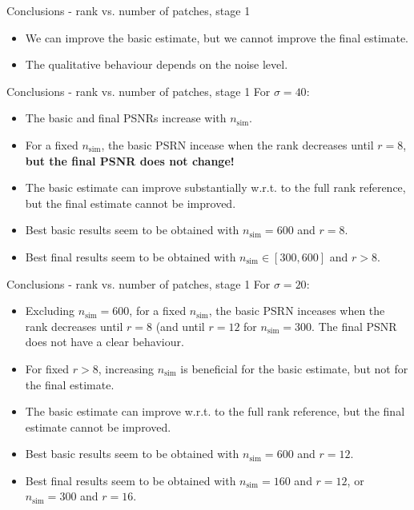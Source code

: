\documentclass[mathserif, 8pt]{beamer}
\makeatletter
\newcounter{multipleslide}
\newcommand{\multipleframe}{%
\setcounter{multipleslide}{\value{framenumber}}
\stepcounter{multipleslide}
\patchcmd{\beamer@@tmpl@footline}%
	{\insertframenumber}%
	{\themultipleslide}%
	{}%
	{}%
}
\makeatother
\begin{document}
\multipleframe
\begin{frame}{Conclusions - rank vs. number of patches, stage 1}
	\begin{itemize}\itemsep=2cm
		\item We can improve the basic estimate, but we cannot improve the final estimate.
		\item The qualitative behaviour depends on the noise level.
	\end{itemize}
\end{frame}

\begin{frame}{Conclusions - rank vs. number of patches, stage 1}
	For $\sigma = 40$:
	\begin{itemize}\itemsep=.3cm
		\item The basic and final PSNRs increase with $n_{\text{sim}}$.
		\item For a fixed $n_{\text{sim}}$, the basic PSRN incease when the
			rank decreases until $r = 8$, \textbf{but the final PSNR does not change!}
		\item The basic estimate can improve substantially w.r.t. to the
			full rank reference, but the final estimate cannot be improved.
		\item Best basic results seem to be obtained with $n_{\text{sim}} = 
			600$ and $r = 8$.
		\item Best final results seem to be obtained with $n_{\text{sim}}\in
			[300,600]$ and $r > 8$.
	\end{itemize}
\end{frame}

\begin{frame}{Conclusions - rank vs. number of patches, stage 1}
	For $\sigma = 20$:
	\begin{itemize}\itemsep=.3cm
		\item Excluding $n_{\text{sim}} = 600$, for a fixed
			$n_{\text{sim}}$, the basic PSRN inceases when the rank decreases
			until $r = 8$ (and until $r = 12$ for $n_{\text{sim}} = 300$.
			The final PSNR does not have a clear behaviour.
		\item For fixed $r > 8$, increasing $n_{\text{sim}}$ is beneficial for the
			basic estimate, but not for the final estimate.
		\item The basic estimate can improve w.r.t. to the
			full rank reference, but the final estimate cannot be improved.
		\item Best basic results seem to be obtained with $n_{\text{sim}} = 
			600$ and $r = 12$.
		\item Best final results seem to be obtained with $n_{\text{sim}}=
			160$ and $r = 12$, or $n_{\text{sim}}=
			300$ and $r = 16$.
	\end{itemize}
\end{frame}
\end{document}
